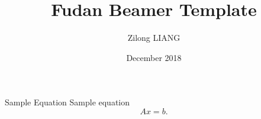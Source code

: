 \documentclass{beamer}
\title{Fudan Beamer Template}
\author{Zilong LIANG}
\institute{School of Mathematical Sciences}
\date{December 2018}
\begin{document}
  
  \begin{frame}
    \maketitle
  \end{frame}

  \begin{frame}{Sample Equation}
    Sample equation
    $$ Ax = b. $$
  \end{frame}
\end{document}
